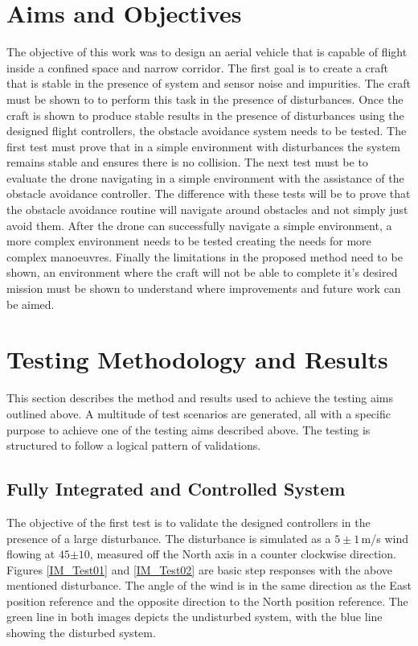 	\section{Aims and Objectives}
	The objective of this work was to design an aerial vehicle that is capable of flight inside a confined space and narrow corridor. The first goal is to create a craft that is stable in the presence of system and sensor noise and impurities. The craft must be shown to to perform this task in the presence of disturbances. Once the craft is shown to produce stable results in the presence of disturbances using the designed flight controllers, the obstacle avoidance system needs to be tested. The first test must prove that in a simple environment with disturbances the system remains stable and ensures there is no collision. The next test must be to evaluate the drone navigating in a simple environment with the assistance of the obstacle avoidance controller. The difference with these tests will be to prove that the obstacle avoidance routine will navigate around obstacles and not simply just avoid them. After the drone can successfully navigate a simple environment, a more complex environment needs to be tested creating the needs for more complex manoeuvres. Finally the limitations in the proposed method need to be shown, an environment where the craft will not be able to complete it's desired mission must be shown to understand where improvements and future work can be aimed.

	\section{Testing Methodology and Results}
	This section describes the method and results used to achieve the testing aims outlined above. A multitude of test scenarios are generated, all with a specific purpose to achieve one of the testing aims described above. The testing is structured to follow a logical pattern of validations.
	
		\subsection{Fully Integrated and Controlled System}
		The objective of the first test is to validate the designed controllers in the presence of a large disturbance. The disturbance is simulated as a $5\pm1$\,m/s wind flowing at $45$\textdegree$\pm10$\textdegree, measured off the North axis in a counter clockwise direction. Figures \ref{IM_Test01} and \ref{IM_Test02} are basic step responses with the above mentioned disturbance. The angle of the wind is in the same direction as the East position reference and the opposite direction to the North position reference. The green line in both images depicts the undisturbed system, with the blue line showing the disturbed system.
		
